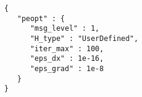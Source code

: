 \begin{lstlisting}[style=json,caption={PEOpt uses this input specification to minimize the equality constrained problem specified in Listing \ref{lst:simpleEq}.  We explain this specification Chapter \ref{ch:Input}.},label=lst:simpleEqJSON]
{
   "peopt" : {
      "msg_level" : 1,
      "H_type" : "UserDefined",
      "iter_max" : 100,
      "eps_dx" : 1e-16,
      "eps_grad" : 1e-8
   }
}
\end{lstlisting}
